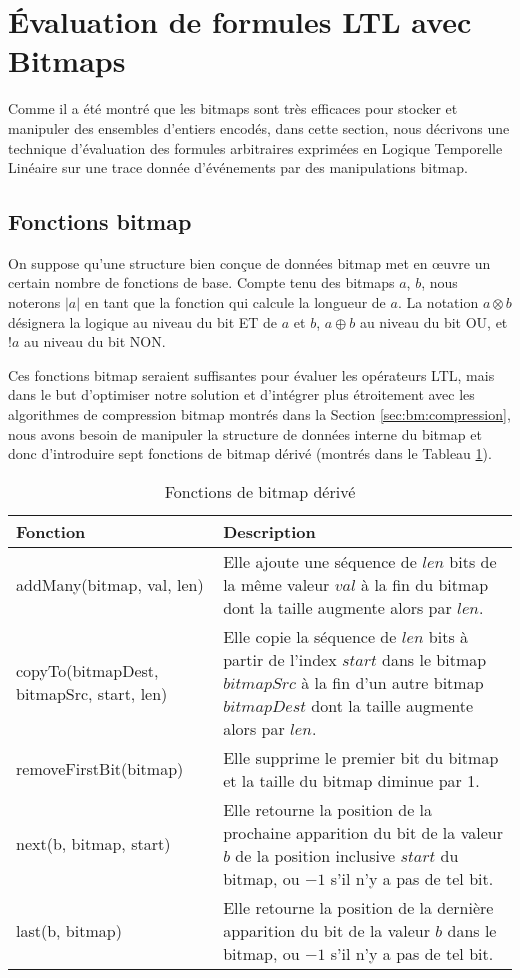 \section{Évaluation de formules LTL avec Bitmaps}\label{sec:bm:ltlbitmap} %

Comme il a été montré que les bitmaps sont très efficaces pour stocker et manipuler des ensembles d'entiers encodés, dans cette section, nous décrivons une technique d'évaluation des formules arbitraires exprimées en Logique Temporelle Linéaire sur une trace donnée d'événements par des manipulations bitmap.

\subsection{Fonctions bitmap}

On suppose qu'une structure bien conçue de données bitmap met en \oe{}uvre un certain nombre de fonctions de base. Compte tenu des bitmaps $a$, $b$, nous noterons $|a|$ en tant que la fonction qui calcule la longueur de $a$. La notation $a \otimes b$ désignera la logique au niveau du bit ET de $a$ et $b$, $a \oplus b$ au niveau du bit OU, et $!a$ au niveau du bit NON.

Ces fonctions bitmap seraient suffisantes pour évaluer les opérateurs LTL, mais dans le but d'optimiser notre solution et d'intégrer plus étroitement avec les algorithmes de compression bitmap montrés dans la Section \ref{sec:bm:compression}, nous avons besoin de manipuler la structure de données interne du bitmap et donc d'introduire sept fonctions de bitmap dérivé (montrés dans le Tableau \ref{tbl:bm:bmhelpers}).

\begin{table}
\centering
\begin{tabular}{|p{1.5in}|p{3.25in}|}
\hline
Fonction & Description \\
\hline
addMany(bitmap, val, len) & Elle ajoute une séquence de $len$ bits de la même valeur $val$ à la fin du bitmap dont la taille augmente alors par $len$. \\
\hline
copyTo(bitmapDest, bitmapSrc, start, len) & Elle copie la séquence de $len$ bits à partir de l'index $start$ dans le bitmap $bitmapSrc$ à la fin d'un autre bitmap $bitmapDest$ dont la taille augmente alors par $len$. \\
\hline
removeFirstBit(bitmap) & Elle supprime le premier bit du bitmap et la taille du bitmap diminue par 1. \\
\hline
next(b, bitmap, start) & Elle retourne la position de la prochaine apparition du bit de la valeur $b$ de la position inclusive $start$ du bitmap, ou $-1$ s'il n'y a pas de tel bit. \\
\hline
last(b, bitmap) & Elle retourne la position de la dernière apparition du bit de la valeur $b$ dans le bitmap, ou $-1$ s'il n'y a pas de tel bit. \\
\hline
\end{tabular}
\caption{Fonctions de bitmap dérivé}
\label{tbl:bm:bmhelpers}
\end{table}

